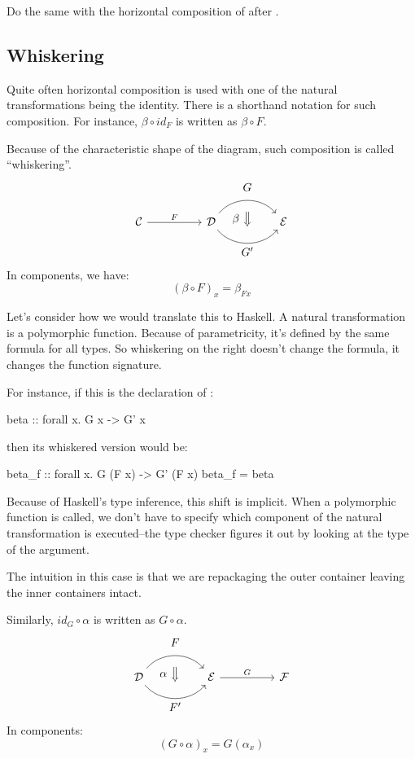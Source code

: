 \documentclass[DaoFP]{subfiles}
\begin{document}
\begin{exercise}
Do the same with the horizontal composition of  after . 
\end{exercise}

\subsection{Whiskering}

Quite often horizontal composition is used with one of the natural transformations being the identity. There is a shorthand notation for such composition. For instance, $\beta \circ id_F$ is written as $\beta \circ F$. 

Because of the characteristic shape of the diagram, such composition is called ``whiskering''.
\[
\begin{tikzcd}[column sep=huge]
\mathcal{C}
 \arrow[r, "F"]
 &
\mathcal{D}
  \arrow[bend left=50]{r}[name=U1, label=above:$G$]{}
  \arrow[bend right=50]{r}[name=D1, label=below:$G'$]{} 
 &
\mathcal{E}
  \arrow[shorten <=10pt,shorten >=10pt,Rightarrow,to path={(U1) -- node[label=left:$\beta$] {} (D1)}]{}
\end{tikzcd}
\]
In components, we have:
\[ (\beta \circ F)_x = \beta_{F x} \]

Let's consider how we would translate this to Haskell. A natural transformation is a polymorphic function. Because of parametricity, it's defined by the same formula for all types. So whiskering on the right doesn't change the formula, it changes the function signature. 

For instance, if this is the declaration of :
\begin{haskell}
beta :: forall x. G x -> G' x
\end{haskell}
then its whiskered version would be:
\begin{haskell}
beta_f :: forall x. G (F x) -> G' (F x)
beta_f = beta
\end{haskell}
Because of Haskell's type inference, this shift is implicit. When a polymorphic function is called, we don't have to specify which component of the natural transformation is executed--the type checker figures it out by looking at the type of the argument. 

The intuition in this case is that we are repackaging the outer container leaving the inner containers intact.

Similarly, $id_G \circ \alpha$ is written as $G \circ \alpha$.
\[
\begin{tikzcd}[column sep=huge]
\mathcal{D}
  \arrow[bend left=50]{r}[name=U, label=above:$F$]{}
  \arrow[bend right=50]{r}[name=D, label=below:$F'$]{} 
 &
\mathcal{E}
\arrow[r, "G"]
&
\mathcal{F}
  \arrow[shorten <=10pt,shorten >=10pt,Rightarrow,to path={(U) -- node[label=left:$\alpha$] {} (D)}]{}
\end{tikzcd}
\]
In components:
\[(G \circ \alpha)_x = G (\alpha_x) \]
\end{document}
